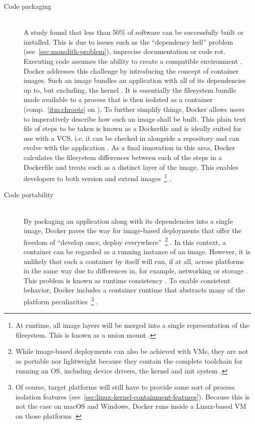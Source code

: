 \begin{description}
  \item[Code packaging]
  \hfill \\
  A study found that less than 50\% of software can be successfully built or installed.  This is due to issues such as the \enquote{dependency hell} problem (see~\autoref{sec:monolith-problem}), imprecise documentation or code rot. Executing code assumes the ability to create a compatible environment \cite[p.~72]{boettiger2015introduction}. Docker addresses this challenge by introducing the concept of container images. Such an image bundles an application with all of its dependencies up to, but excluding, the kernel \cite[p.~1]{merkel2014docker}. It is essentially the filesystem bundle made available to a process that is then isolated as a container (comp.~\ref{itm:chroots} on ). To further simplify things, Docker allows users to imperatively describe how such an image shall be built. This plain text file of steps to be taken is known as a Dockerfile and is ideally suited for use with a \acs{VCS}, i.e. it can be checked in alongside a repository and can evolve with the application \cite[p.~74]{boettiger2015introduction}. As a final innovation in this area, Docker calculates the filesystem differences between each of the steps in a Dockerfile and treats each as a distinct layer of the image. This enables developers to both version and extend images~\footnote{At runtime, all image layers will be merged into a single representation of the filesystem. This is known as a union mount \cite[p.~26]{pahl2015containerization}. } \cite[p.~1]{merkel2014docker}.

  \item[Code portability]
  \hfill \\
  By packaging an application along with its dependencies into a single image, Docker paves the way for image-based deployments that offer the freedom of \enquote{develop once, deploy everywhere}~\footnote{While image-based deployments can also be achieved with \acsp{VM}, they are not as portable nor lightweight because they contain the complete toolchain for running an \acs{OS}, including device drivers, the kernel and init system \cite[p.~203]{kang2016container} \cite[p.~2]{eder2016hypervisor}.} \cite[p.~203]{kang2016container}. In this context, a container can be regarded as a running instance of an image. However, it is unlikely that such a container by itself will run, if at all, across platforms in the same way due to differences in, for example, networking or storage \cite[pp.~74--75]{boettiger2015introduction}. This problem is known as runtime consistency \cite[p.~203]{kang2016container}. To enable consistent behavior, Docker includes a container runtime that abstracts many of the platform peculiarities~\footnote{Of course, target platforms will still have to provide some sort of process isolation features (see~\autoref{sec:linux-kernel-containment-features}). Because this is not the case on macOS and Windows, Docker runs inside a Linux-based \acs{VM} on those platforms \cite[p.~5]{merkel2014docker}.} \cite[p.~75]{boettiger2015introduction}.


\end{description}
